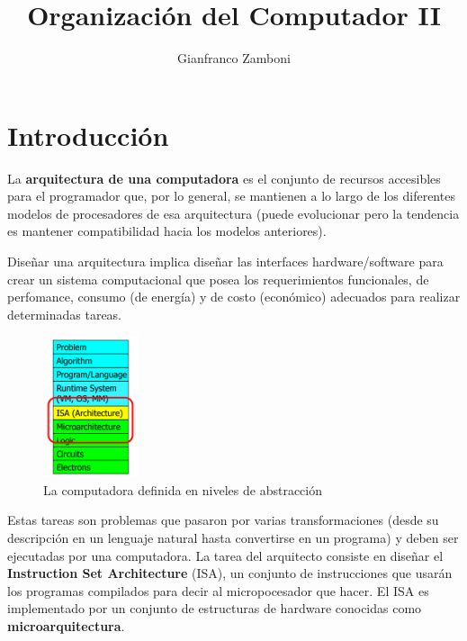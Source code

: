 



\title{Organización del Computador II}
\author{Gianfranco Zamboni}



\newcommand{\red}[1]{{\color{red}#1}}  			%


	\maketitle
	\tableofcontents

\newpage
\section{Introducción}

La \textbf{arquitectura de una computadora} es el conjunto de recursos accesibles para el programador que, por lo general, se mantienen a lo largo de los diferentes modelos de procesadores de esa arquitectura (puede evolucionar pero la tendencia es mantener compatibilidad hacia los modelos anteriores).

Diseñar una arquitectura implica diseñar las interfaces hardware/software para crear un sistema computacional que posea los requerimientos funcionales, de perfomance, consumo (de energía) y de costo (económico) adecuados para realizar determinadas tareas.

\begin{figure}
	\centering
	\includegraphics[width=0.25\textwidth]{imagenes/arquitectura}
	\caption{La computadora definida en niveles de abstracción}
	\label{fig:intro::arquitectura}
\end{figure}

Estas tareas son problemas que pasaron por varias transformaciones (desde su descripción en un lenguaje natural hasta convertirse en un programa) y deben ser ejecutadas por una computadora. La tarea del arquitecto consiste en diseñar el \textbf{Instruction Set Architecture} (ISA), un conjunto de instrucciones que usarán los programas compilados para decir al micropocesador que hacer. El ISA es implementado por un conjunto de estructuras de hardware conocidas como \textbf{microarquitectura}.

